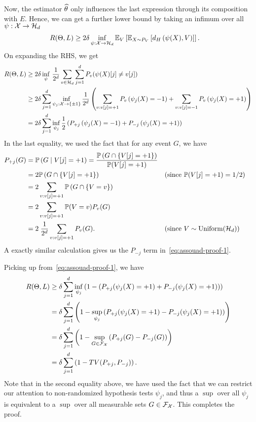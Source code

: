 \documentclass[12pt]{article}
\begin{document}
	Now, the estimator $\widehat{\theta}$ only influences the last expression through its composition with $E$. Hence, we can get a further lower bound by taking an infimum over all $\psi:{\cal X} \to {\cal H}_d$
	\begin{align}
			R(\Theta, L) & \geq 	
			2\delta \inf_{\psi:{\cal X} \to {\cal H}_d} \mathbb{E}_{V}\left[ \mathbb{E}_{X \sim P_V} \left[ d_H\left( \psi(X), V \right) \right] \right].  
	\end{align}
	On expanding the RHS, we get 
	\begin{align}
		R(\Theta, L) & \geq 2 \delta \inf_{\psi} \, \frac{1}{2^d} \sum_{v \in {\cal H}_d} \sum_{j=1}^d P_v(\psi(X)[j] \neq v[j]) \\ 
		& \geq 2 \delta \sum_{j=1}^d \inf_{\psi_j:{\cal X} \to \{\pm 1\}} \frac{1}{2^d} \left( \sum_{v:v[j]=+1} P_v\left( \psi_j(X) = -1 \right) + \sum_{v:v[j]=-1} P_v\left( \psi_j(X) = +1 \right) \right) \\
		& = 2 \delta  \sum_{j=1}^d \inf_{\psi_j} \frac 1 2 \left( P_{+j}\left( \psi_j(X)=-1 \right)  + P_{-j}\left( \psi_j(X)=+1 \right)\right) \label{eq:assouad-proof-1}
	\end{align}
	In the last equality, we used the fact that  for any event $G$, we have 
	\begin{align}
		P_{+j}(G) &= \mathbb{P}\left( G \mid V[j]=+1 \right) = \frac{\mathbb{P}\left( G \cap\{ V[j]=+1\} \right)}{\mathbb{P}(V[j]=+1)} \\
		& = 2 \mathbb{P}\left( G \cap \{V[j] = +1\} \right) && (\text{since } \mathbb{P}(V[j]=+1)=1/2) \\
		& = 2 \sum_{v:v[j]=+1} \mathbb{P}\left( G \cap \{ V = v\} \right) \\
		& = 2 \sum_{v: v[j]=+1} \mathbb{P}(V=v) P_v(G) \\
		& = 2\; \frac{1}{2^d} \sum_{v: v[j]=+1} P_v(G). && (\text{since } V\sim\mathrm{Uniform}({\cal H}_d))
	\end{align}
	A exactly similar calculation  gives us the $P_{-j}$ term in~\eqref{eq:assouad-proof-1}. 

	Picking up from~\eqref{eq:assouad-proof-1}, we have 
	\begin{align}
		R(\Theta, L) & \geq \delta \sum_{j=1}^d \inf_{\psi_j} \left( 1 - \left( P_{+j}(\psi_j(X)=+1) + P_{-j}(\psi_j(X)=+1) \right)\right) \\
		& =  \delta \sum_{j=1}^d  \left( 1 - \sup_{\psi_j}\left( P_{+j}(\psi_j(X)=+1) - P_{-j}(\psi_j(X)=+1) \right)\right) \\
		& = \delta \sum_{j=1}^d  \left( 1 - \sup_{G \in {\cal F}_{{\cal X}}}\left( P_{+j}(G) - P_{-j}(G) \right)\right) \\
		& =  \delta \sum_{j=1}^d \left( 1 - TV(P_{+j}, P_{-j}) \right). 
	\end{align}
	Note that in the second equality above, we have used the fact that we can restrict our attention to non-randomized hypothesis tests $\psi_j$, and thus a $\sup$ over all $\psi_j$ is equivalent to a $\sup$ over all measurable sets $G \in {\cal F}_{{\cal X}}$. 
	This completes the proof. 
\hfill\qedsymbol
\end{document}
